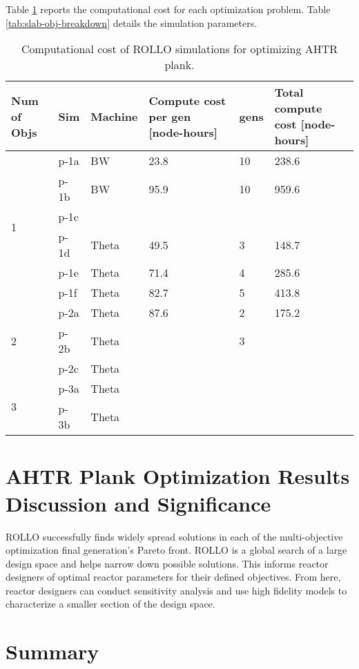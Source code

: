 Table \ref{tab:plank-compute-cost} reports the computational cost for each optimization 
problem. 
Table \ref{tab:slab-obj-breakdown} details the simulation parameters. 
\begin{table}[htbp]
    \centering
    \onehalfspacing
    \caption{Computational cost of \acrfull{ROLLO} simulations for optimizing \acrfull{AHTR}
    plank.}
	\label{tab:plank-compute-cost}
    \footnotesize
    \begin{tabular}{p{1.4cm}|p{1cm}lp{4cm}lp{4cm}}
    \hline 
    \textbf{Num of Objs} & \textbf{Sim} & \textbf{Machine} & \textbf{Compute cost per gen [node-hours]} &\textbf{gens} & \textbf{Total compute cost [node-hours]} \\
    \hline
    \multirow{6}{2cm}{1} 
    & p-1a & BW & 23.8 & 10 & 238.6\\
    & p-1b & BW & 95.9 & 10 & 959.6\\
    & p-1c & & & & \\
    & p-1d & Theta & 49.5 & 3 & 148.7\\
    & p-1e & Theta & 71.4 & 4 & 285.6\\
    & p-1f & Theta & 82.7 & 5 & 413.8 \\
    \hline
    \multirow{3}{2cm}{2}
    & p-2a & Theta & 87.6 & 2 & 175.2\\
    & p-2b & Theta & & 3 & \\
    & p-2c & Theta & & & \\
    \hline
    \multirow{2}{2cm}{3}
    & p-3a & Theta & & & \\
    & p-3b & Theta & & & \\
    \hline
    \end{tabular}
\end{table}

\section{AHTR Plank Optimization Results Discussion and Significance}
\label{sec:plank-discussion}
\gls{ROLLO} successfully finds widely spread solutions in each of the multi-objective 
optimization final generation's Pareto front.
\gls{ROLLO} is a global search of a large design space and helps narrow down possible 
solutions.
This informs reactor designers of optimal reactor parameters for their defined objectives.  
From here, reactor designers can conduct sensitivity analysis and use high fidelity 
models to characterize a smaller section of the design space.

\section{Summary}